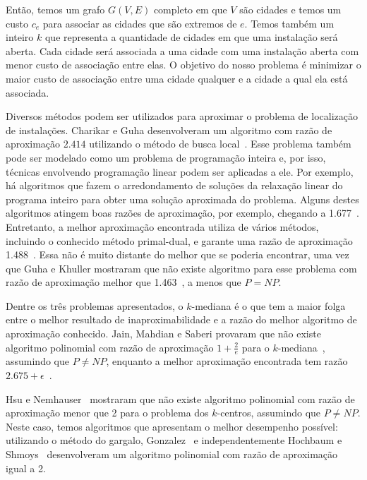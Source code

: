 \documentclass[12pt]{article}
\newcommand{\NP}{\mathit{NP}}
\begin{document}
Então, temos um grafo $G(V,E)$ completo em que $V$ são cidades e temos um custo $c_{e}$ para associar as cidades que são extremos de $e$. Temos também um inteiro $k$ que representa a quantidade de cidades em que uma instalação será aberta. Cada cidade será associada a uma cidade com uma instalação aberta com menor custo de associação entre elas. O objetivo do nosso problema é minimizar o maior custo de associação entre uma cidade qualquer e a cidade a qual ela está associada.



Diversos métodos podem ser utilizados para aproximar o problema de localização de instalações. Charikar e Guha desenvolveram um algoritmo com razão de aproximação $2.414$ utilizando o método de busca local~\cite{Charikar&Guha'05}.  Esse problema também pode ser modelado como um problema de programação inteira e, por isso, técnicas envolvendo programação linear podem ser aplicadas a ele.  Por exemplo, há algoritmos que fazem o arredondamento de soluções da relaxação linear do programa inteiro para obter uma solução aproximada do problema.  Alguns destes algoritmos atingem boas razões de aproximação, por exemplo, chegando a 1.677~\cite{Byrka&Aardal'10}. Entretanto, a melhor aproximação encontrada utiliza de vários métodos, incluindo o conhecido método primal-dual, e garante uma razão de aproximação 1.488~\cite{LI'13}. Essa não é muito distante do melhor que se poderia encontrar, uma vez que Guha e Khuller mostraram que não existe algoritmo para esse problema com razão de aproximação melhor que 1.463~\cite{GUHA1999228}, a menos que $P = \NP$.


Dentre os três problemas apresentados, o $k$-mediana é o que tem a maior folga entre o melhor resultado de inaproximabilidade e a razão do melhor algoritmo de aproximação conhecido. Jain, Mahdian e Saberi provaram que não existe algoritmo polinomial com razão de aproximação $1+ \frac{2}{e}$ para o $k$-mediana~\cite{JMS'02}, assumindo que $P \neq \NP$, enquanto a melhor aproximação encontrada tem razão $2.675 + \epsilon$~\cite{BPRST'17}.


Hsu e Nemhauser~\cite{HSU1979209} mostraram que não existe algoritmo polinomial com razão de aproximação menor que 2 para o problema dos $k$-centros, assumindo que $P\neq\NP$. Neste caso, temos algoritmos que apresentam o melhor desempenho possível: utilizando o método do gargalo, Gonzalez~\cite{GONZALEZ1985293} e independentemente Hochbaum e Shmoys~\cite{HochShmoys'85} desenvolveram um algoritmo polinomial com razão de aproximação igual a 2.
\end{document}
